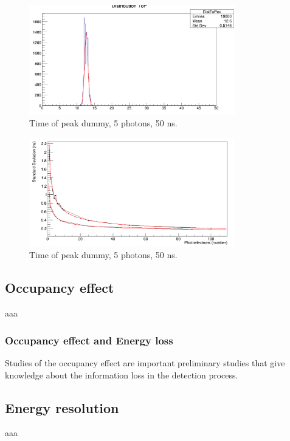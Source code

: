\begin{figure}
	\centering
	\includegraphics[width=0.8\textwidth]{IMG/top_dummy}
	\caption{Time of peak dummy, 5 photons, 50 ns.}
	\label{fig:top_dummy}
\end{figure}

\begin{figure}
	\centering
	\includegraphics[width=0.8\textwidth]{IMG/top_sigma}
	\caption{Time of peak dummy, 5 photons, 50 ns.}
	\label{fig:top_sigma}
\end{figure}


\subsection{Occupancy effect} \label{subsec:Sat_effect}
aaa

\subsubsection{Occupancy effect and Energy loss}
Studies of the occupancy effect are important preliminary studies that give knowledge about the information loss in the detection process.\\

\subsection{Energy resolution} \label{subsec:E_res}
aaa


